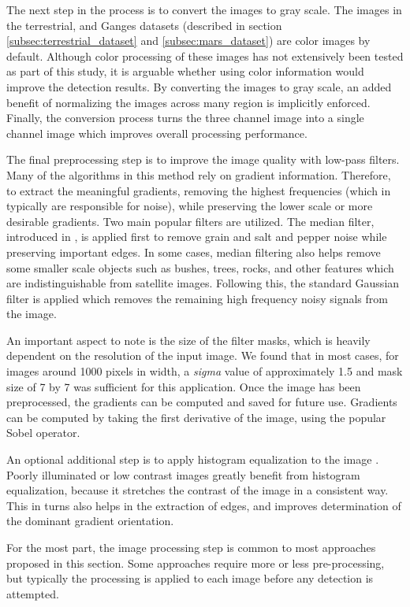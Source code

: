The next step in the process is to convert the images to gray scale. The images in the terrestrial, and Ganges datasets (described in section \ref{subsec:terrestrial_dataset} and \ref{subsec:mars_dataset}) are color images by default. Although color processing of these images has not extensively been tested as part of this study, it is arguable whether using color information would improve the detection results. By converting the images to gray scale, an added benefit of normalizing the images across many region is implicitly enforced. Finally, the conversion process turns the three channel image into a single channel image which improves overall processing performance.

The final preprocessing step is to improve the image quality with low-pass filters. Many of the algorithms in this method rely on gradient information. Therefore, to extract the meaningful gradients, removing the highest frequencies (which in typically are responsible for noise), while preserving the lower scale or more desirable gradients. Two main popular filters are utilized. The median filter, introduced in \cite{huang_median_filtering_algorithm}, is applied first to remove grain and salt and pepper noise while preserving important edges. In some cases, median filtering also helps remove some smaller scale objects such as bushes, trees, rocks, and other features which are indistinguishable from satellite images. Following this, the standard Gaussian filter is applied which removes the remaining high frequency noisy signals from the image.

An important aspect to note is the size of the filter masks, which is heavily dependent on the resolution of the input image. We found that in most cases, for images around 1000 pixels in width, a \emph{sigma} value of approximately 1.5 and mask size of 7 by 7 was sufficient for this application. Once the image has been preprocessed, the gradients can be computed and saved for future use. Gradients can be computed by taking the first derivative of the image, using the popular Sobel operator.

An optional additional step is to apply histogram equalization to the image \cite{digital_image_processing_book}. Poorly illuminated or low contrast images greatly benefit from histogram equalization, because it stretches the contrast of the image in a consistent way. This in turns also helps in the extraction of edges, and improves determination of the dominant gradient orientation.

For the most part, the image processing step is common to most approaches proposed in this section. Some approaches require more or less pre-processing, but typically the processing is applied to each image before any detection is attempted.

